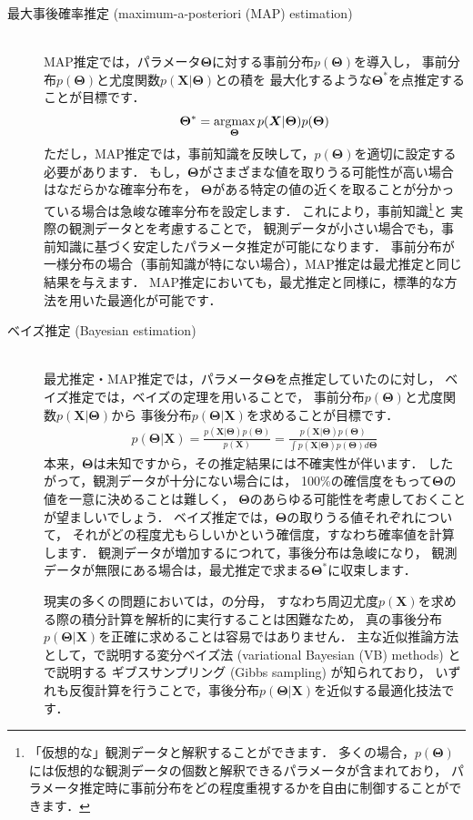 \begin{description}
\item[最大事後確率推定 (maximum-a-posteriori (MAP) estimation)] \ \\
MAP推定では，パラメータ$\bm\Theta$に対する事前分布$p(\bm\Theta)$を導入し，
事前分布$p(\bm\Theta)$と尤度関数$p(\bm{X}|\bm\Theta)$との積を
最大化するような$\bm\Theta^*$を点推定することが目標です．
\begin{align}
\bm\Theta^* = \mathop{\mathrm{argmax}}_{\bm\Theta} p(\bm{X}|\bm\Theta) p(\bm\Theta)
\end{align}
ただし，MAP推定では，事前知識を反映して，$p(\bm\Theta)$を適切に設定する必要があります．
もし，$\bm\Theta$がさまざまな値を取りうる可能性が高い場合はなだらかな確率分布を，
$\bm\Theta$がある特定の値の近くを取ることが分かっている場合は急峻な確率分布を設定します．
これにより，事前知識\footnote{「仮想的な」観測データと解釈することができます．
多くの場合，$p(\bm\Theta)$には仮想的な観測データの個数と解釈できるパラメータが含まれており，
パラメータ推定時に事前分布をどの程度重視するかを自由に制御することができます．}と
実際の観測データとを考慮することで，
観測データが小さい場合でも，事前知識に基づく安定したパラメータ推定が可能になります．
事前分布が一様分布の場合（事前知識が特にない場合），MAP推定は最尤推定と同じ結果を与えます．
MAP推定においても，最尤推定と同様に，標準的な方法を用いた最適化が可能です．

\item[ベイズ推定 (Bayesian estimation)] \ \\
最尤推定・MAP推定では，パラメータ$\bm\Theta$を点推定していたのに対し，
ベイズ推定では，ベイズの定理を用いることで，
事前分布$p(\bm\Theta)$と尤度関数$p(\bm{X}|\bm\Theta)$から
事後分布$p(\bm\Theta|\bm{X})$を求めることが目標です．
\begin{align}
 p(\bm\Theta|\bm{X}) 
 = \frac{p(\bm{X}|\bm\Theta)p(\bm\Theta)}{p(\bm{X})}
 = \frac{p(\bm{X}|\bm\Theta)p(\bm\Theta)}{\int p(\bm{X}|\bm\Theta) p(\bm\Theta) d\bm\Theta}
 \label{eq:bayes_theorem}
\end{align}
本来，$\bm\Theta$は未知ですから，その推定結果には不確実性が伴います．
したがって，観測データが十分にない場合には，
100\%の確信度をもって$\bm\Theta$の値を一意に決めることは難しく，
$\bm\Theta$のあらゆる可能性を考慮しておくことが望ましいでしょう．
ベイズ推定では，$\bm\Theta$の取りうる値それぞれについて，
それがどの程度尤もらしいかという確信度，すなわち確率値を計算します．
観測データが増加するにつれて，事後分布は急峻になり，
観測データが無限にある場合は，最尤推定で求まる$\bm\Theta^*$に収束します．

現実の多くの問題においては，の分母，
すなわち周辺尤度$p(\bm{X})$を求める際の積分計算を解析的に実行することは困難なため，
真の事後分布$p(\bm\Theta|\bm{X})$を正確に求めることは容易ではありません．
主な近似推論方法として，で説明する変分ベイズ法 (variational Bayesian (VB) methods) と
で説明する
ギブスサンプリング (Gibbs sampling) が知られており，
いずれも反復計算を行うことで，事後分布$p(\bm\Theta|\bm{X})$を近似する最適化技法です．
\end{description}

